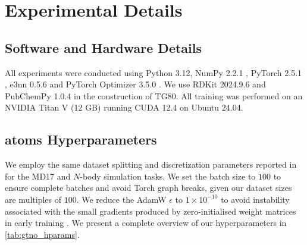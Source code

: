 \section{Experimental Details}
\subsection{Software and Hardware Details}
All experiments were conducted using Python 3.12, NumPy 2.2.1 \cite{harris_array_2020}, PyTorch 2.5.1 \cite{paszke_pytorch_2019}, e3nn 0.5.6 \cite{geiger_e3nn_2022} and PyTorch Optimizer 3.5.0 \cite{kim_pytorch_optimizer_2021}. We use RDKit 2024.9.6 \cite{greg_landrum_rdkit_2012} and PubChemPy 1.0.4 in the construction of TG80. All training was performed on an NVIDIA Titan V (12 GB) running CUDA 12.4 on Ubuntu 24.04.

\subsection{\gls{atoms} Hyperparameters}
\label{sec:my_hyperparams}
We employ the same dataset splitting and discretization parameters reported in \textcite{xu_equivariant_2024} for the MD17 and \(N\)-body simulation tasks. We set the batch size to \(100\) to ensure complete batches and avoid Torch graph breaks, given our dataset sizes are multiples of \(100\). We reduce the AdamW \(\epsilon\) to \(1\times10^{-10}\) to avoid instability associated with the small gradients produced by zero-initialised weight matrices in early training \cite{jordan_nanogpt_2025}. We present a complete overview of our hyperparameters in \cref{tab:gtno_hparams}.

